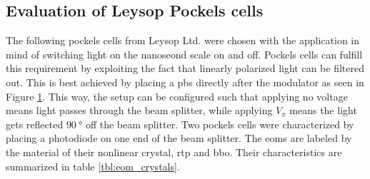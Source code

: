 \subsection{Evaluation of Leysop Pockels cells}

The following pockels cells from Leysop Ltd. were chosen with the application in mind of switching light on the nanoseond scale on and off. Pockels cells can fulfill this requirement by exploiting the fact that linearly polarized light can be filtered out. This is best achieved by placing a \ac{pbs} directly after the modulator as seen in Figure \ref{fig:eom_setup}. This way, the setup can be configured such that applying no voltage means light passes through the beam splitter, while applying $V_\pi$ means the light gets reflected $\SI{90}{\degree}$ off the beam splitter.
Two  pockels cells were characterized by placing a photodiode on one end of the beam splitter. The \acp{eom} are labeled by the material of their nonlinear crystal, \ac{rtp} and \ac{bbo}. Their characteristics are summarized in table \ref{tbl:eom_crystals}.

\begin{figure}[t]
	\label{fig:eom_setup}
\end{figure}

